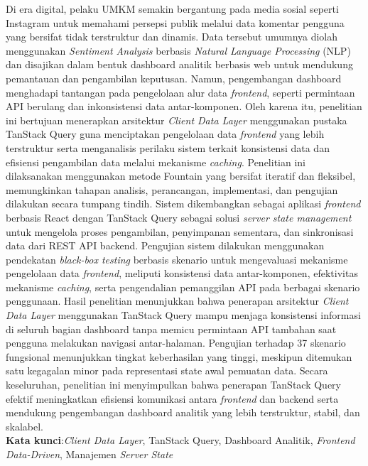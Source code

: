 Di era digital, pelaku UMKM semakin bergantung pada media sosial seperti Instagram untuk memahami persepsi publik melalui data komentar pengguna yang bersifat tidak terstruktur dan dinamis. Data tersebut umumnya diolah menggunakan \textit{Sentiment Analysis} berbasis \textit{Natural Language Processing} (NLP) dan disajikan dalam bentuk dashboard analitik berbasis web untuk mendukung pemantauan dan pengambilan keputusan. Namun, pengembangan dashboard menghadapi tantangan pada pengelolaan alur data \textit{frontend}, seperti permintaan API berulang dan inkonsistensi data antar-komponen. Oleh karena itu, penelitian ini bertujuan menerapkan arsitektur \textit{Client Data Layer} menggunakan pustaka TanStack Query guna menciptakan pengelolaan data \textit{frontend} yang lebih terstruktur serta menganalisis perilaku sistem terkait konsistensi data dan efisiensi pengambilan data melalui mekanisme \textit{caching}. Penelitian ini dilaksanakan menggunakan metode Fountain yang bersifat iteratif dan fleksibel, memungkinkan tahapan analisis, perancangan, implementasi, dan pengujian dilakukan secara tumpang tindih. Sistem dikembangkan sebagai aplikasi \textit{frontend} berbasis React dengan TanStack Query sebagai solusi \textit{server state management} untuk mengelola proses pengambilan, penyimpanan sementara, dan sinkronisasi data dari REST API backend. Pengujian sistem dilakukan menggunakan pendekatan \textit{black-box testing} berbasis skenario untuk mengevaluasi mekanisme pengelolaan data \textit{frontend}, meliputi konsistensi data antar-komponen, efektivitas mekanisme \textit{caching}, serta pengendalian pemanggilan API pada berbagai skenario penggunaan. Hasil penelitian menunjukkan bahwa penerapan arsitektur \textit{Client Data Layer} menggunakan TanStack Query mampu menjaga konsistensi informasi di seluruh bagian dashboard tanpa memicu permintaan API tambahan saat pengguna melakukan navigasi antar-halaman. Pengujian terhadap 37 skenario fungsional menunjukkan tingkat keberhasilan yang tinggi, meskipun ditemukan satu kegagalan minor pada representasi state awal pemuatan data. Secara keseluruhan, penelitian ini menyimpulkan bahwa penerapan TanStack Query efektif meningkatkan efisiensi komunikasi antara \textit{frontend} dan backend serta mendukung pengembangan dashboard analitik yang lebih terstruktur, stabil, dan skalabel. \\ [0.6cm]
\noindent \textbf{Kata kunci}:\textit{Client Data Layer}, TanStack Query, Dashboard Analitik, \textit{Frontend Data-Driven}, Manajemen \textit{Server State}
